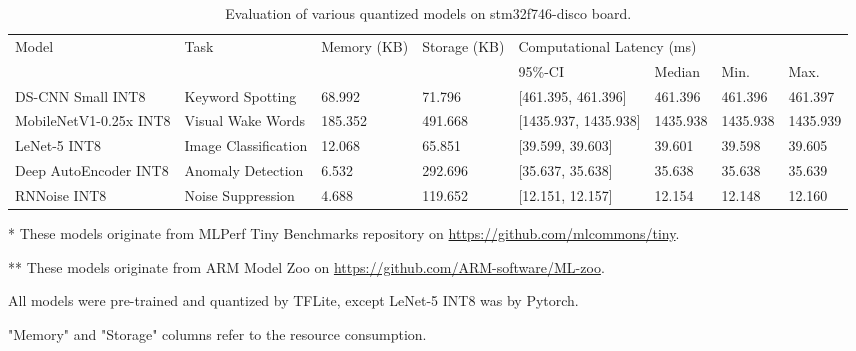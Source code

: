 \begin{table}[ht]
\centering
\begin{threeparttable}
\caption{Evaluation of various quantized models on stm32f746-disco board.}
\label{tab:per-model-eval-result-multimodel}
\begin{tabular}{llllllll}
\hline
\multirow{2}{*}{Model} & \multirow{2}{*}{Task} & \multirow{2}{*}{Memory (KB)} & \multirow{2}{*}{Storage (KB)} & \multicolumn{4}{l}{Computational Latency   (ms)} \\ \cline{5-8}
                       &                       &                              &                               & 95\%-CI      & Median      & Min.     & Max.     \\\hline
DS-CNN   Small INT8\tnote{**}    & Keyword Spotting      &    68.992       &    71.796         &   [461.395, 461.396]  &    461.396         &   461.396       &   461.397       \\
MobileNetV1-0.25x INT8\tnote{*}         & Visual Wake Words     &  185.352      &    491.668         &  [1435.937, 1435.938]  &   1435.938           &  1435.938         &    1435.939      \\
LeNet-5 INT8          & Image Classification  &     12.068      &    65.851             &    [39.599, 39.603]          &   39.601   &   39.598       &   39.605     \\
Deep AutoEncoder INT8\tnote{*}         & Anomaly Detection     &    6.532     &   292.696 & [35.637, 35.638]    &     35.638   &    35.638   &    35.639   \\
RNNoise INT8\tnote{**}           & Noise Suppression     &   4.688       &    119.652        &   [12.151, 12.157]    &   12.154   &   12.148       &   12.160      \\\hline
\end{tabular}
\begin{tablenotes}
\item [*] These models originate from MLPerf Tiny Benchmarks repository on \url{https://github.com/mlcommons/tiny}.
\item [**] These models originate from ARM Model Zoo on \url{https://github.com/ARM-software/ML-zoo}.
\item All models were pre-trained and quantized by TFLite, except LeNet-5 INT8 was by Pytorch.
\item "Memory" and "Storage" columns refer to the resource consumption.
\end{tablenotes}
\end{threeparttable}
\end{table}

